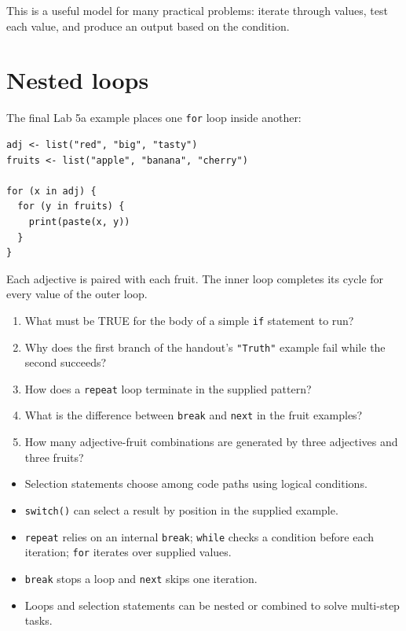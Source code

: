 This is a useful model for many practical problems: iterate through values, test each value, and produce an output based on the condition.

\section{Nested loops}

The final Lab 5a example places one \texttt{for} loop inside another:

\begin{lstlisting}[style=dsr]
adj <- list("red", "big", "tasty")
fruits <- list("apple", "banana", "cherry")

for (x in adj) {
  for (y in fruits) {
    print(paste(x, y))
  }
}
\end{lstlisting}

Each adjective is paired with each fruit. The inner loop completes its cycle for every value of the outer loop.

\begin{quickcheck}
\begin{enumerate}
  \item What must be TRUE for the body of a simple \texttt{if} statement to run?
  \item Why does the first branch of the handout's \texttt{"Truth"} example fail while the second succeeds?
  \item How does a \texttt{repeat} loop terminate in the supplied pattern?
  \item What is the difference between \texttt{break} and \texttt{next} in the fruit examples?
  \item How many adjective-fruit combinations are generated by three adjectives and three fruits?
\end{enumerate}
\end{quickcheck}

\begin{chapterrecap}
\begin{itemize}
  \item Selection statements choose among code paths using logical conditions.
  \item \texttt{switch()} can select a result by position in the supplied example.
  \item \texttt{repeat} relies on an internal \texttt{break}; \texttt{while} checks a condition before each iteration; \texttt{for} iterates over supplied values.
  \item \texttt{break} stops a loop and \texttt{next} skips one iteration.
  \item Loops and selection statements can be nested or combined to solve multi-step tasks.
\end{itemize}
\end{chapterrecap}
